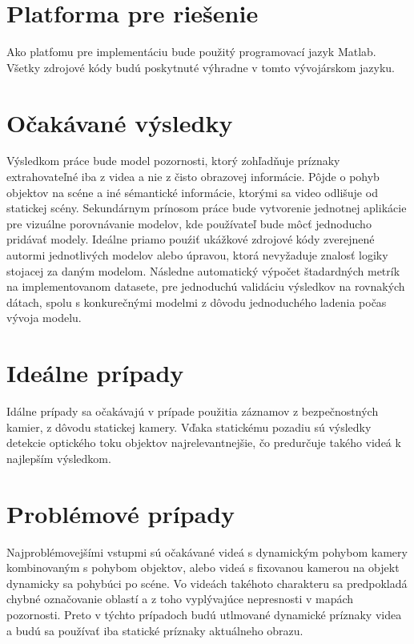 \section{Platforma pre riešenie}
Ako platfomu pre implementáciu bude použitý programovací jazyk Matlab\textregistered.
Všetky zdrojové kódy budú poskytnuté výhradne v tomto vývojárskom jazyku.
\section{Očakávané výsledky}
Výsledkom práce bude model pozornosti, ktorý zohľadňuje príznaky extrahovateľné iba z videa a nie z čisto obrazovej informácie.
Pôjde o pohyb objektov na scéne a iné sémantické informácie, ktorými sa video odlišuje od statickej scény.
Sekundárnym prínosom práce bude vytvorenie jednotnej aplikácie pre vizuálne porovnávanie modelov, kde používateľ bude môcť jednoducho pridávať modely. Ideálne priamo pouźiť ukážkové zdrojové kódy zverejnené autormi jednotlivých modelov alebo úpravou, ktorá nevyžaduje znalosť logiky stojacej za daným modelom.
Následne automatický výpočet štadardných metrík na implementovanom datasete, pre jednoduchú validáciu výsledkov na rovnakých dátach, spolu s konkurečnými modelmi z dôvodu jednoduchého ladenia počas vývoja modelu.
\section{Ideálne prípady}
Idálne prípady sa očakávajú v prípade použitia záznamov z bezpečnostných kamier, z dôvodu statickej kamery.
Vďaka statickému pozadiu sú výsledky detekcie optického toku objektov najrelevantnejšie, čo predurčuje takého videá k najlepším výsledkom.
\section{Problémové prípady}
Najproblémovejšími vstupmi sú očakávané videá s dynamickým pohybom kamery kombinovaným s pohybom objektov, alebo videá s fixovanou kamerou na objekt dynamicky sa pohybúci po scéne.
Vo videách takéhoto charakteru sa predpokladá chybné označovanie oblastí a z toho vyplývajúce nepresnosti v mapách pozornosti.
Preto v týchto prípadoch budú utlmované dynamické príznaky videa a budú sa používať iba statické príznaky aktuálneho obrazu.
